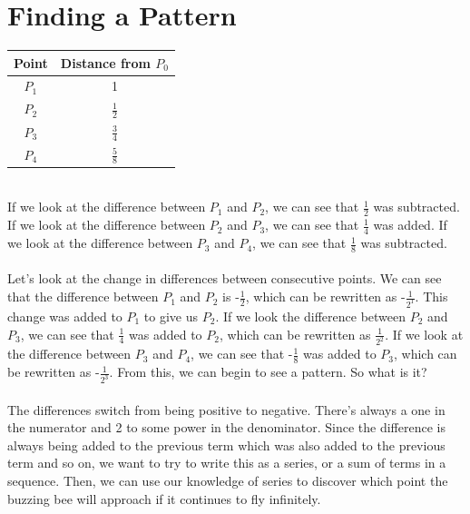 \documentclass[a4paper,openright, 14pt]{article}
\begin{document}
\section*{Finding a Pattern}
\begin{tabular}{c|c}
Point & Distance from $P_0$\\
    \hline
    $P_1$ & 1 \\
    \hline
    $P_2$ & $\frac{1}{2}$ \\
    \hline
    $P_3$ & $\frac{3}{4}$ \\
    \hline
    $P_4$ & $\frac{5}{8}$
\end{tabular}
\\
If we look at the difference between $P_1$ and $P_2$, we can see that $\frac{1}{2}$ was subtracted. If we look at the difference between $P_2$ and $P_3$, we can see that $\frac{1}{4}$ was added. If we look at the difference between $P_3$ and $P_4$, we can see that $\frac{1}{8}$ was subtracted.\\\\
Let's look at the change in differences between consecutive points. We can see that the difference between $P_1$ and $P_2$ is -$\frac{1}{2}$, which can be rewritten as -$\frac{1}{2^1}$. This change was added to $P_1$ to give us $P_2$. If we look the difference between $P_2$ and $P_3$, we can see that $\frac{1}{4}$ was added to $P_2$, which can be rewritten as $\frac{1}{2^2}$. If we look at the difference between $P_3$ and $P_4$, we can see that -$\frac{1}{8}$ was added to $P_3$, which can be rewritten as -$\frac{1}{2^3}$. From this, we can begin to see a pattern. So what is it?\\\\
The differences switch from being positive to negative. There's always a one in the numerator and 2 to some power in the denominator. Since the difference is always being added to the previous term which was also added to the previous term and so on, we want to try to write this as a series, or a sum of terms in a sequence. Then, we can use our knowledge of series to discover which point the buzzing bee will approach if it continues to fly infinitely. 
\end{document}

